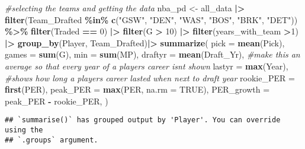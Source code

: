 \documentclass[
]{article}
\newenvironment{Shaded}{\begin{snugshade}}{\end{snugshade}}
\newcommand{\AttributeTok}[1]{\textcolor[rgb]{0.13,0.29,0.53}{#1}}
\newcommand{\CommentTok}[1]{\textcolor[rgb]{0.56,0.35,0.01}{\textit{#1}}}
\newcommand{\ConstantTok}[1]{\textcolor[rgb]{0.56,0.35,0.01}{#1}}
\newcommand{\DecValTok}[1]{\textcolor[rgb]{0.00,0.00,0.81}{#1}}
\newcommand{\FunctionTok}[1]{\textcolor[rgb]{0.13,0.29,0.53}{\textbf{#1}}}
\newcommand{\NormalTok}[1]{#1}
\newcommand{\OtherTok}[1]{\textcolor[rgb]{0.56,0.35,0.01}{#1}}
\newcommand{\SpecialCharTok}[1]{\textcolor[rgb]{0.81,0.36,0.00}{\textbf{#1}}}
\newcommand{\StringTok}[1]{\textcolor[rgb]{0.31,0.60,0.02}{#1}}
\begin{document}
\begin{Shaded}
\begin{Highlighting}[]
\CommentTok{\#selecting the teams and getting the data}
\NormalTok{nba\_pd }\OtherTok{\textless{}{-}}\NormalTok{ all\_data }\SpecialCharTok{|\textgreater{}} \FunctionTok{filter}\NormalTok{(Team\_Drafted }\SpecialCharTok{\%in\%} \FunctionTok{c}\NormalTok{(}\StringTok{"GSW"}\NormalTok{, }\StringTok{"DEN"}\NormalTok{, }\StringTok{"WAS"}\NormalTok{, }\StringTok{"BOS"}\NormalTok{, }\StringTok{"BRK"}\NormalTok{, }\StringTok{"DET"}\NormalTok{)) }\SpecialCharTok{\%\textgreater{}\%} \FunctionTok{filter}\NormalTok{(Traded }\SpecialCharTok{==} \DecValTok{0}\NormalTok{) }\SpecialCharTok{|\textgreater{}} \FunctionTok{filter}\NormalTok{(G }\SpecialCharTok{\textgreater{}} \DecValTok{10}\NormalTok{) }\SpecialCharTok{|\textgreater{}} \FunctionTok{filter}\NormalTok{(years\_with\_team }\SpecialCharTok{\textgreater{}}\DecValTok{1}\NormalTok{) }\SpecialCharTok{|\textgreater{}} \FunctionTok{group\_by}\NormalTok{(Player, Team\_Drafted)}\SpecialCharTok{|\textgreater{}}
  \FunctionTok{summarize}\NormalTok{(}
    \AttributeTok{pick =} \FunctionTok{mean}\NormalTok{(Pick),}
    \AttributeTok{games =} \FunctionTok{sum}\NormalTok{(G),}
    \AttributeTok{min =} \FunctionTok{sum}\NormalTok{(MP),}
    \AttributeTok{draftyr =} \FunctionTok{mean}\NormalTok{(Draft\_Yr), }\CommentTok{\#make this an average so that every year of a player\textquotesingle{}s career isn\textquotesingle{}t shown}
    \AttributeTok{lastyr =} \FunctionTok{max}\NormalTok{(Year), }\CommentTok{\#shows how long a player\textquotesingle{}s career lasted when next to draft year}
    \AttributeTok{rookie\_PER =} \FunctionTok{first}\NormalTok{(PER),}
    \AttributeTok{peak\_PER =} \FunctionTok{max}\NormalTok{(PER, }\AttributeTok{na.rm =} \ConstantTok{TRUE}\NormalTok{),}
    \AttributeTok{PER\_growth =}\NormalTok{ peak\_PER }\SpecialCharTok{{-}}\NormalTok{ rookie\_PER,}
\NormalTok{    )}
\end{Highlighting}
\end{Shaded}

\begin{verbatim}
## `summarise()` has grouped output by 'Player'. You can override using the
## `.groups` argument.
\end{verbatim}
\end{document}
